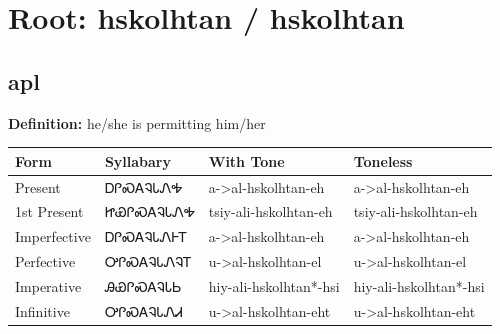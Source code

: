 \documentclass{article}%
\begin{document}
%
\normalsize%
\section*{Root: hskolhtan / hskolhtan}%
\subsection*{apl}%
\textbf{Definition: }%
he/she is permitting him/her%
\\[0.5em]%
\begin{tabular}{|l|l|l|l|}%
\hline%
\textbf{Form}&\textbf{Syllabary}&\textbf{With Tone}&\textbf{Toneless}\\%
\hline%
Present&ᎠᎵᏍᎪᎸᏓᏁᎭ&a{-}>al{-}hskolhtan{-}eh&a{-}>al{-}hskolhtan{-}eh\\%
1st Present&ᏥᏯᎵᏍᎪᎸᏓᏁᎭ&tsiy{-}ali{-}hskolhtan{-}eh&tsiy{-}ali{-}hskolhtan{-}eh\\%
Imperfective&ᎠᎵᏍᎪᎸᏓᏁᎰᎢ&a{-}>al{-}hskolhtan{-}eh&a{-}>al{-}hskolhtan{-}eh\\%
Perfective&ᎤᎵᏍᎪᎸᏓᏁᎸᎢ&u{-}>al{-}hskolhtan{-}el&u{-}>al{-}hskolhtan{-}el\\%
Imperative&ᎯᏯᎵᏍᎪᎸᏓᏏ&hiy{-}ali{-}hskolhtan*{-}hsi&hiy{-}ali{-}hskolhtan*{-}hsi\\%
Infinitive&ᎤᎵᏍᎪᎸᏓᏁᏗ&u{-}>al{-}hskolhtan{-}eht&u{-}>al{-}hskolhtan{-}eht\\%
\hline%
\end{tabular}%
\\[1em]%
\end{document}
